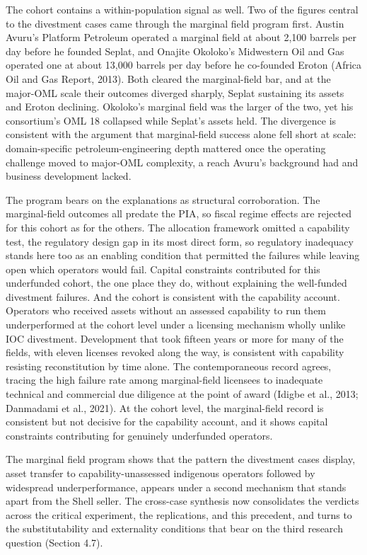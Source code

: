 \documentclass[twoside,fontset=lmodern]{mitthesis}
\begin{document}
The cohort contains a within-population signal as well. Two of the
figures central to the divestment cases came through the marginal field
program first. Austin Avuru's Platform Petroleum operated a marginal
field at about 2,100 barrels per day before he founded Seplat, and
Onajite Okoloko's Midwestern Oil and Gas operated one at about 13,000
barrels per day before he co-founded Eroton (Africa Oil and Gas Report,
2013). Both cleared the marginal-field bar, and at the major-OML scale
their outcomes diverged sharply, Seplat sustaining its assets and Eroton
declining. Okoloko's marginal field was the larger of the two, yet his
consortium's OML 18 collapsed while Seplat's assets held. The divergence
is consistent with the argument that marginal-field success alone fell
short at scale: domain-specific petroleum-engineering depth mattered
once the operating challenge moved to major-OML complexity, a reach
Avuru's background had and business development lacked.

The program bears on the explanations as structural corroboration. The
marginal-field outcomes all predate the PIA, so fiscal regime effects
are rejected for this cohort as for the others. The allocation framework
omitted a capability test, the regulatory design gap in its most direct
form, so regulatory inadequacy stands here too as an enabling condition
that permitted the failures while leaving open which operators would
fail. Capital constraints contributed for this underfunded cohort, the
one place they do, without explaining the well-funded divestment
failures. And the cohort is consistent with the capability account.
Operators who received assets without an assessed capability to run them
underperformed at the cohort level under a licensing mechanism wholly
unlike IOC divestment. Development that took fifteen years or more for
many of the fields, with eleven licenses revoked along the way, is
consistent with capability resisting reconstitution by time alone. The
contemporaneous record agrees, tracing the high failure rate among
marginal-field licensees to inadequate technical and commercial due
diligence at the point of award (Idigbe et al., 2013; Danmadami et al.,
2021). At the cohort level, the marginal-field record is consistent but
not decisive for the capability account, and it shows capital
constraints contributing for genuinely underfunded operators.

The marginal field program shows that the pattern the divestment cases
display, asset transfer to capability-unassessed indigenous operators
followed by widespread underperformance, appears under a second
mechanism that stands apart from the Shell seller. The cross-case
synthesis now consolidates the verdicts across the critical experiment,
the replications, and this precedent, and turns to the substitutability
and externality conditions that bear on the third research question
(Section 4.7).
\end{document}
